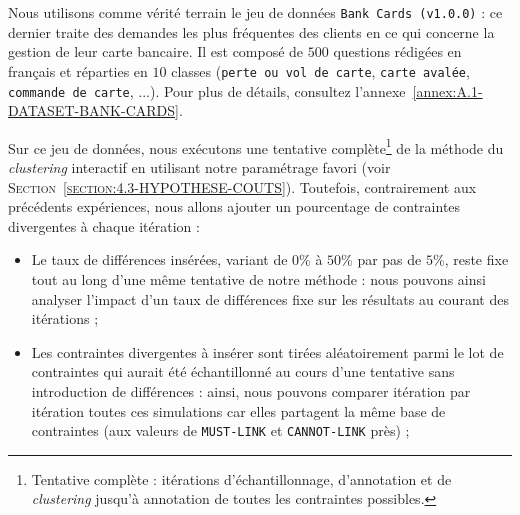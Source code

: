 			Nous utilisons comme vérité terrain le jeu de données \texttt{Bank Cards (v1.0.0)} : ce dernier traite des demandes les plus fréquentes des clients en ce qui concerne la gestion de leur carte bancaire.
			Il est composé de $500$ questions rédigées en français et réparties en $10$ classes (\texttt{perte ou vol de carte}, \texttt{carte avalée}, \texttt{commande de carte}, ...).
			Pour plus de détails, consultez l'annexe~\ref{annex:A.1-DATASET-BANK-CARDS}.
			
			Sur ce jeu de données, nous exécutons une tentative complète\footnote{
				Tentative complète : itérations d'échantillonnage, d'annotation et de \textit{clustering} jusqu'à annotation de toutes les contraintes possibles.
			}
			de la méthode du \textit{clustering} interactif en utilisant notre paramétrage favori (voir \textsc{Section~\ref{section:4.3-HYPOTHESE-COUTS}}).
			Toutefois, contrairement aux précédents expériences, nous allons ajouter un pourcentage de contraintes divergentes à chaque itération :
			\begin{itemize}
				\item Le taux de différences insérées, variant de $0$\% à $50$\% par pas de $5$\%, reste fixe tout au long d'une même tentative de notre méthode : nous pouvons ainsi analyser l'impact d'un taux de différences fixe sur les résultats au courant des itérations ;
				\item Les contraintes divergentes à insérer sont tirées aléatoirement parmi le lot de contraintes qui aurait été échantillonné au cours d'une tentative sans introduction de différences : ainsi, nous pouvons comparer itération par itération toutes ces simulations car elles partagent la même base de contraintes (aux valeurs de \texttt{MUST-LINK} et \texttt{CANNOT-LINK} près) ;
			\end{itemize}
			
